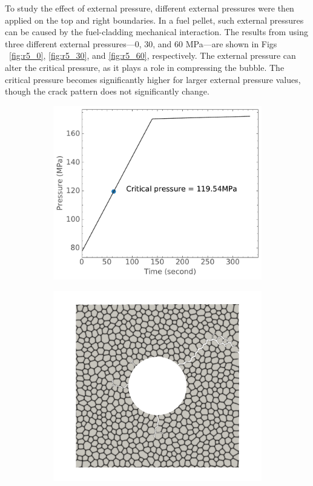 To study the effect of external pressure, different external pressures were then applied on the top and right boundaries. In a fuel pellet, such external pressures can be caused by the fuel-cladding mechanical interaction. The results from using three different external pressures---0, 30, and 60 MPa---are shown in Figs ~\ref{fig:r5_0}, \ref{fig:r5_30}, and \ref{fig:r5_60}, respectively. The external pressure can alter the critical pressure, as it plays a role in compressing the bubble. The critical pressure becomes significantly higher for larger external pressure values, though the crack pattern does not significantly change.

\begin{figure}[htb!]
  \centering
  \begin{subfigure}[t]{0.32\linewidth}
    \centering
    \includegraphics[width=\linewidth]{Chapter3/figures/bubble_pressure_r0.5_ext30_rod196}
    \caption{}
  \end{subfigure}
  \begin{subfigure}[t]{0.32\linewidth}
    \centering
    \includegraphics[width=\linewidth]{Chapter3/figures/r5_ext30}

\end{subfigure}
\end{figure}
